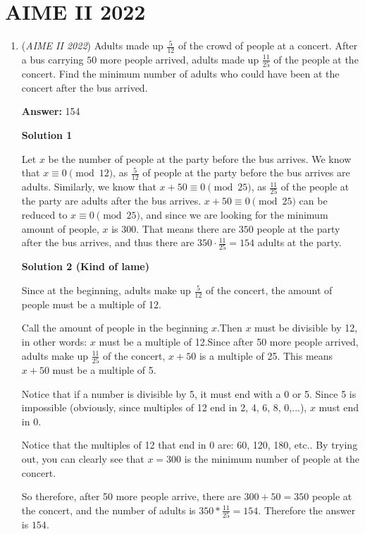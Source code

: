 \section{AIME II 2022}
        \begin{enumerate}
        	\item (\textit{AIME II 2022}) Adults made up $\frac5{12}$ of the crowd of people at a concert. After a bus carrying $50$ more people arrived, adults made up $\frac{11}{25}$ of the people at the concert. Find the minimum number of adults who could have been at the concert after the bus arrived.


 
 \textbf{Answer: }154



\textbf{Solution 1}

Let $x$ be the number of people at the party before the bus arrives. We know that $x\equiv 0\pmod {12}$, as $\frac{5}{12}$ of people at the party before the bus arrives are adults. Similarly, we know that $x + 50 \equiv 0 \pmod{25}$, as $\frac{11}{25}$ of the people at the party are adults after the bus arrives. $x + 50 \equiv 0 \pmod{25}$ can be reduced to $x \equiv 0 \pmod{25}$, and since we are looking for the minimum amount of people, $x$ is $300$. That means there are $350$ people at the party after the bus arrives, and thus there are $350 \cdot \frac{11}{25} = \boxed{154}$ adults at the party.

 



\textbf{Solution 2 (Kind of lame)}

Since at the beginning, adults make up $\frac{5}{12}$ of the concert, the amount of people must be a multiple of 12.

 Call the amount of people in the beginning $x$.Then $x$ must be divisible by 12, in other words: $x$ must be a multiple of 12.Since after 50 more people arrived, adults make up $\frac{11}{25}$ of the concert, $x+50$ is a multiple of 25. This means $x+50$ must be a multiple of 5.

 Notice that if a number is divisible by 5, it must end with a 0 or 5. Since 5 is impossible (obviously, since multiples of 12 end in 2, 4, 6, 8, 0,...), $x$ must end in 0.

 Notice that the multiples of 12 that end in 0 are: 60, 120, 180, etc.. By trying out, you can clearly see that $x=300$ is the minimum number of people at the concert.

 So therefore, after 50 more people arrive, there are $300+50=350$ people at the concert, and the number of adults is $350*\frac{11}{25}=154$. Therefore the answer is $\boxed{154}$. 


\end{enumerate}
